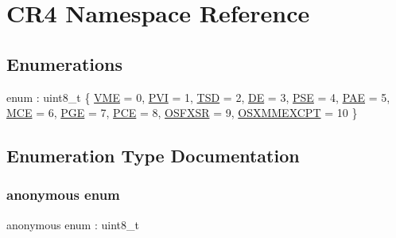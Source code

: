 \hypertarget{namespace_c_r4}{}\section{C\+R4 Namespace Reference}
\label{namespace_c_r4}
\subsection*{Enumerations}
\begin{DoxyCompactItemize}
\item 
enum \+: uint8\+\_\+t \{ \newline
\hyperlink{namespace_c_r4_a8969be482f1ac252e3dc7b9264588f1faa569bc9b3252f731550182a03c650797}{V\+ME} = 0, 
\hyperlink{namespace_c_r4_a8969be482f1ac252e3dc7b9264588f1fa6b65c8f982880d05c6a32200c60242db}{P\+VI} = 1, 
\hyperlink{namespace_c_r4_a8969be482f1ac252e3dc7b9264588f1face0ed188ba0369731b44b7df079a518b}{T\+SD} = 2, 
\hyperlink{namespace_c_r4_a8969be482f1ac252e3dc7b9264588f1fa6ba0a01eeee81d3b2b4165a5084b507a}{DE} = 3, 
\newline
\hyperlink{namespace_c_r4_a8969be482f1ac252e3dc7b9264588f1faf62a80eb9fee090b45e3962ca9adb6cd}{P\+SE} = 4, 
\hyperlink{namespace_c_r4_a8969be482f1ac252e3dc7b9264588f1fa3a3afec51c05f51090a3d704d31ff310}{P\+AE} = 5, 
\hyperlink{namespace_c_r4_a8969be482f1ac252e3dc7b9264588f1fab6bdf44cebbecb78a845af15d91a1d0a}{M\+CE} = 6, 
\hyperlink{namespace_c_r4_a8969be482f1ac252e3dc7b9264588f1fadef854f9df515146e4f5c5b7c46206ee}{P\+GE} = 7, 
\newline
\hyperlink{namespace_c_r4_a8969be482f1ac252e3dc7b9264588f1fafd06ff4443c1659425fefcc65fc76419}{P\+CE} = 8, 
\hyperlink{namespace_c_r4_a8969be482f1ac252e3dc7b9264588f1fab0cf978bb5b8c32070363ab81d327c53}{O\+S\+F\+X\+SR} = 9, 
\hyperlink{namespace_c_r4_a8969be482f1ac252e3dc7b9264588f1fabb68ec0930317011b84484346947f472}{O\+S\+X\+M\+M\+E\+X\+C\+PT} = 10
 \}
\end{DoxyCompactItemize}


\subsection{Enumeration Type Documentation}
\mbox{\label{namespace_c_r4_a8969be482f1ac252e3dc7b9264588f1f}} 
\subsubsection{\texorpdfstring{anonymous enum}{anonymous enum}}
{\footnotesize\ttfamily anonymous enum \+: uint8\+\_\+t}


